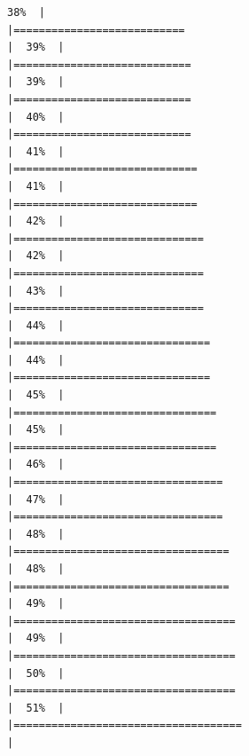 \documentclass[
  english,
  man,a4paper,mask,floatsintext]{apa6}
\begin{document}
\begin{verbatim}
38%  |                                                                              |===========================                                           |  39%  |                                                                              |============================                                          |  39%  |                                                                              |============================                                          |  40%  |                                                                              |============================                                          |  41%  |                                                                              |=============================                                         |  41%  |                                                                              |=============================                                         |  42%  |                                                                              |==============================                                        |  42%  |                                                                              |==============================                                        |  43%  |                                                                              |==============================                                        |  44%  |                                                                              |===============================                                       |  44%  |                                                                              |===============================                                       |  45%  |                                                                              |================================                                      |  45%  |                                                                              |================================                                      |  46%  |                                                                              |=================================                                     |  47%  |                                                                              |=================================                                     |  48%  |                                                                              |==================================                                    |  48%  |                                                                              |==================================                                    |  49%  |                                                                              |===================================                                   |  49%  |                                                                              |===================================                                   |  50%  |                                                                              |===================================                                   |  51%  |                                                                              |====================================                                  |  
\end{verbatim}
\end{document}
